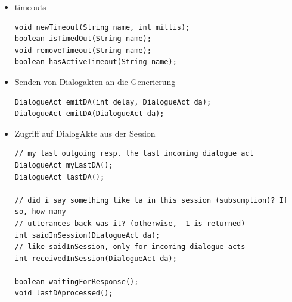 \begin{itemize}
\item timeouts
\begin{verbatim}
void newTimeout(String name, int millis);
boolean isTimedOut(String name);
void removeTimeout(String name);
boolean hasActiveTimeout(String name);
\end{verbatim}
\item Senden von Dialogakten an die Generierung
\begin{verbatim}
DialogueAct emitDA(int delay, DialogueAct da);
DialogueAct emitDA(DialogueAct da);
\end{verbatim}
\item Zugriff auf DialogAkte aus der Session
\begin{verbatim}
// my last outgoing resp. the last incoming dialogue act
DialogueAct myLastDA();
DialogueAct lastDA();

// did i say something like ta in this session (subsumption)? If so, how many
// utterances back was it? (otherwise, -1 is returned)
int saidInSession(DialogueAct da);
// like saidInSession, only for incoming dialogue acts
int receivedInSession(DialogueAct da);

boolean waitingForResponse();
void lastDAprocessed();
\end{verbatim}
\end{itemize}

